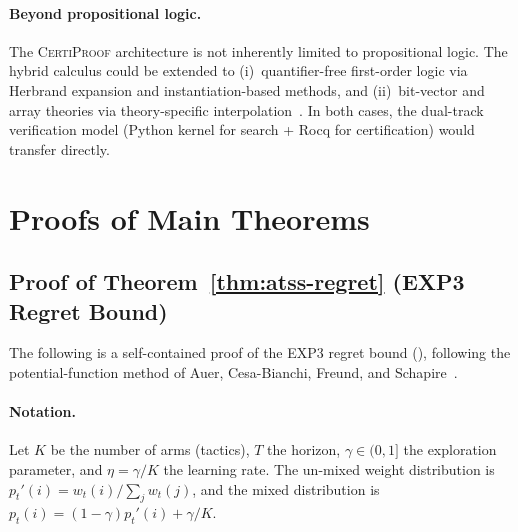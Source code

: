 \documentclass[acmtocl,review,anonymous]{acmart}
\newcommand{\CP}{\textsc{CertiProof}}
\begin{document}
\paragraph{Beyond propositional logic.}
The \CP{} architecture is not inherently limited to propositional
logic.  The hybrid calculus could be extended to (i)~quantifier-free
first-order logic via Herbrand expansion and instantiation-based
methods, and (ii)~bit-vector and array theories via theory-specific
interpolation~\cite{McMillan2003}.  In both cases, the dual-track
verification model (Python kernel for search + Rocq for
certification) would transfer directly.





\appendix

\section{Proofs of Main Theorems}
\label{app:proofs}

\subsection{Proof of Theorem~\ref{thm:atss-regret} (EXP3 Regret Bound)}

The following is a self-contained proof of the EXP3 regret bound
(), following the potential-function method of
Auer, Cesa-Bianchi, Freund, and
Schapire~\cite{AuerCesaBianchiFreundSchapire2002}.

\paragraph{Notation.}  Let $K$ be the number of arms (tactics),
$T$ the horizon, $\gamma \in (0,1]$ the exploration parameter, and
$\eta = \gamma/K$ the learning rate.  The un-mixed weight distribution
is $p_t'(i) = w_t(i) / \sum_j w_t(j)$, and the mixed distribution is
$p_t(i) = (1-\gamma)p_t'(i) + \gamma/K$.
\end{document}
